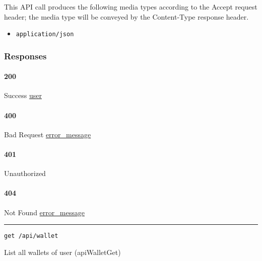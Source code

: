This API call produces the following media types according to the
{Accept} request header; the media type will be conveyed by the
{Content-Type} response header.

\begin{itemize}
\tightlist
\item
  \texttt{application/json}
\end{itemize}

\hypertarget{responses-182}{%
\subsubsection{Responses}\label{responses-182}}

\hypertarget{section-585}{%
\paragraph{200}\label{section-585}}

Success \protect\hyperlink{user}{user}

\hypertarget{section-586}{%
\paragraph{400}\label{section-586}}

Bad Request \protect\hyperlink{error_message}{error\_message}

\hypertarget{section-587}{%
\paragraph{401}\label{section-587}}

Unauthorized \protect\hyperlink{}{}

\hypertarget{section-588}{%
\paragraph{404}\label{section-588}}

Not Found \protect\hyperlink{error_message}{error\_message}

\begin{center}\rule{0.5\linewidth}{\linethickness}\end{center}

\protect\hypertarget{apiWalletGet}{}{}

\begin{verbatim}
get /api/wallet
\end{verbatim}

List all wallets of user ({apiWalletGet})

